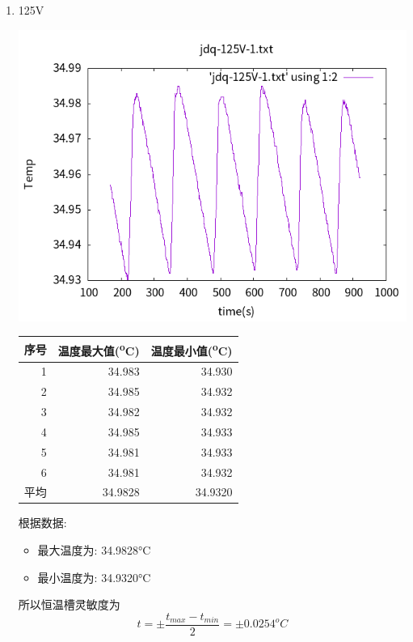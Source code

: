 \documentclass[11pt]{report}
\begin{document}
\begin{enumerate}
\item 125V
\label{sec:orgc92f4e1}
\begin{center}
\includegraphics[width=.9\linewidth]{../img/jdq-125V-1.txt.png}
\end{center}
\begin{center}
\begin{tabular}{rrr}
序号 & 温度最大值(\textsuperscript{o}C) & 温度最小值(\textsuperscript{o}C)\\
\hline
1 & 34.983 & 34.930\\
2 & 34.985 & 34.932\\
3 & 34.982 & 34.932\\
4 & 34.985 & 34.933\\
5 & 34.981 & 34.933\\
6 & 34.981 & 34.932\\
平均 & 34.9828 & 34.9320\\
\end{tabular}
\end{center}

根据数据:
\begin{itemize}
\item 最大温度为: 34.9828°C
\item 最小温度为: 34.9320°C
\end{itemize}
所以恒温槽灵敏度为
\[
t=\pm\frac{t_{max}-t_{min}}{2}=\pm 0.0254^{o}C
\]
\end{enumerate}
\end{document}

